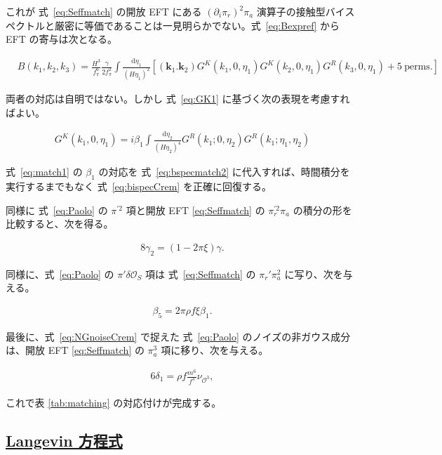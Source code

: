 \documentclass[a4paper,11pt]{ltjsarticle}
\newcommand{\subsectionlink}[1]{\subsection[#1]{\hyperlink{toc}{#1}}}
\numberwithin{equation}{section}
\def\pia{\pi_{a}}
\def\pir{\pi_{r}}
\newcommand{\dd}{\mathrm{d}}
\newcommand{\boldmathsymbol}[1]{{\ensuremath{\boldsymbol{#1}}}}
\newcommand{\bmk}{\boldmathsymbol{k}}
\newcommand{\Eq}[1]{Eq.~(\ref{#1})}
\def\bmk{{\boldsymbol{k}}}
\renewcommand{\Eq}[1]{式~\eqref{#1}}
\begin{document}
これが \Eq{eq:Seffmatch} の開放 EFT にある $(\partial_i\pir)^2\pia$ 演算子の接触型バイスペクトルと厳密に等価であることは一見明らかでない。\Eq{eq:Bexpref} から EFT の寄与は次となる。

\begin{align}\label{eq:bspecmatch2}
    &B(k_1,k_2,k_3) = \frac{H^3}{f_\pi^6}  \frac{\gamma}{2f_{\pi}^{2}}  \int \frac{\dd \eta_1}{\left(H\eta_1\right)^{2}} \left[\left(\bmk_1.\bmk_2\right) G^{K}(k_1, 0, \eta_1) G^{K}(k_2, 0, \eta_1) G^R(k_3, 0, \eta_1) + 5~\mathrm{perms}. \right]
\end{align}

両者の対応は自明ではない。しかし \Eq{eq:GK1} に基づく次の表現を考慮すればよい。

\begin{align}
   G^{K}(k_1, 0, \eta_1) =  i \beta_1 \int \frac{\dd \eta_2}{\left(H\eta_2\right)^{4}} G^R(k_1; 0, \eta_2) G^R(k_1; \eta_1,\eta_2) 
\end{align}

\Eq{eq:match1} の $\beta_1$ の対応を \Eq{eq:bspecmatch2} に代入すれば、時間積分を実行するまでもなく \Eq{eq:bispecCrem} を正確に回復する。

同様に \Eq{eq:Paolo} の $\pi^{\prime2}$ 項と開放 EFT \eqref{eq:Seffmatch} の $\pir^{\prime2}\pia$ の積分の形を比較すると、次を得る。

\begin{align}
    8\gamma_2 =\left(1-2 \pi \xi\right) \gamma.
\end{align}

同様に、\Eq{eq:Paolo} の $\pi'\delta\mathcal{O}_S$ 項は \Eq{eq:Seffmatch} の $\pir'\pia^2$ に写り、次を与える。

\begin{align}
    \beta_5 = 2\pi\rho f\xi \beta_1.
\end{align}

最後に、\Eq{eq:NGnoiseCrem} で捉えた \Eq{eq:Paolo} のノイズの非ガウス成分は、開放 EFT \eqref{eq:Seffmatch} の $\pia^3$ 項に移り、次を与える。

\begin{align}
    6\delta_1 = \rho f \frac{m^6}{f^3} \nu_{\mathcal{O}^3} ,
\end{align}

これで表 \ref{tab:matching} の対応付けが完成する。

\subsectionlink{Langevin 方程式}\label{subsec:Langevin}
\end{document}
